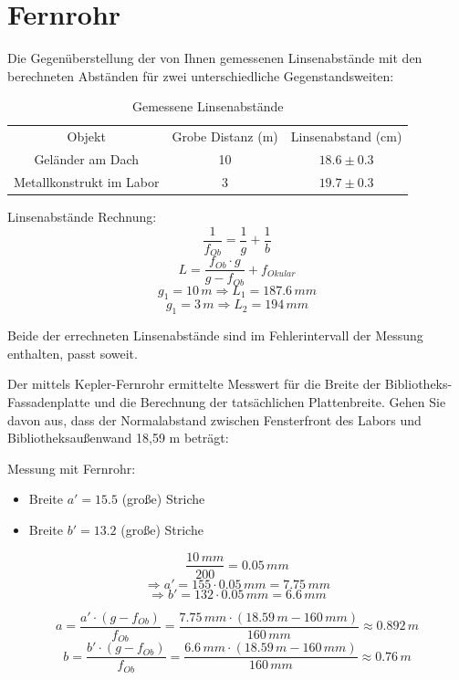 \documentclass[
  headings=optiontotocandhead,
  twoside,
  openright,
  numbers=noenddot,
  toc=flat,
  11pt,
  parskip=full,
  listof=flat,
  bibliography=totoc,
  a4paper,
  DIV=14,
  BCOR=22mm,
  headheight=5mm,
  headinclude=true,
]{scrartcl}
\begin{document}
\section{Fernrohr}

Die Gegenüberstellung der von Ihnen gemessenen Linsenabstände mit den berechneten Abständen für zwei unterschiedliche Gegenstandsweiten:

\begin{table}[H]
  \centering
  \setlength{\tabcolsep}{10pt}
  \begin{tabular}{ |c|c|c| }
    \multicolumn{1}{c}{Objekt} & \multicolumn{1}{c}{Grobe Distanz (m)} & \multicolumn{1}{c}{Linsenabstand (cm)} \\
    Geländer am Dach & 10 & $18.6 \pm 0.3$ \\
    Metallkonstrukt im Labor & 3 & $19.7 \pm 0.3$ \\
  \end{tabular}
  \caption{Gemessene Linsenabstände}
  \label{tab:linsen}
\end{table}

Linsenabstände Rechnung:
$$ \frac{1}{f_{Ob}} = \frac{1}{g} + \frac{1}{b} $$
$$ L = \frac{f_{Ob} \cdot g}{g - f_{Ob}} + f_{Okular} $$
$$ g_1 = 10 \, m \Rightarrow L_1 = 187.6 \, mm $$
$$ g_1 = 3 \, m \Rightarrow L_2 = 194 \, mm $$

Beide der errechneten Linsenabstände sind im Fehlerintervall der Messung enthalten, passt soweit.

Der mittels Kepler-Fernrohr ermittelte Messwert für die Breite der Bibliotheks-Fassadenplatte und die Berechnung der tatsächlichen Plattenbreite. Gehen Sie davon aus, dass der Normalabstand zwischen Fensterfront des Labors und Bibliotheksaußenwand 18,59 m beträgt:

Messung mit Fernrohr:
\begin{itemize}
  \item Breite $a' = 15.5$ (große) Striche
  \item Breite $b' = 13.2$ (große) Striche
\end{itemize}

$$ \frac{10 \, mm}{200} = 0.05 \, mm $$
$$ \Rightarrow a' = 155 \cdot 0.05 \, mm = 7.75\,mm $$
$$ \Rightarrow b' = 132 \cdot 0.05 \, mm = 6.6\,mm $$

$$ a = \frac{a' \cdot (g - f_{Ob})}{f_{Ob}} = \frac{7.75\,mm \cdot (18.59\,m - 160\,mm)}{160\,mm} \approx 0.892 \, m $$
$$ b = \frac{b' \cdot (g - f_{Ob})}{f_{Ob}} = \frac{6.6\,mm \cdot (18.59\,m - 160\,mm)}{160\,mm} \approx 0.76 \, m $$
\end{document}
